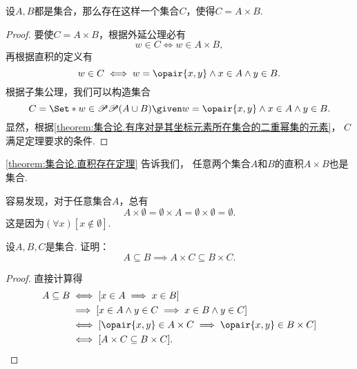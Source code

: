 \begin{theorem}\label{theorem:集合论.直积存在定理}
设\(A,B\)都是集合，那么存在这样一个集合\(C\)，使得\(C = A \times B\).
\begin{proof}
要使\(C = A \times B\)，根据外延公理必有\begin{equation*}
	w \in C \iff w \in A \times B,
\end{equation*}
再根据直积的定义有\begin{equation*}
	w \in C \iff w = \opair{x,y} \land x \in A \land y \in B.
\end{equation*}
根据子集公理，我们可以构造集合\begin{equation*}
	C = \Set*{
		w \in \Powerset\Powerset(A \cup B)
		\given
		w = \opair{x,y} \land x \in A \land y \in B
	}.
\end{equation*}
显然，根据\cref{theorem:集合论.有序对是其坐标元素所在集合的二重幂集的元素}，
\(C\)满足定理要求的条件.
\end{proof}
\end{theorem}
\cref{theorem:集合论.直积存在定理} 告诉我们，
任意两个集合\(A\)和\(B\)的直积\(A \times B\)也是集合.

容易发现，对于任意集合\(A\)，总有\begin{equation}
	A \times \emptyset
	= \emptyset \times A
	= \emptyset \times \emptyset
	= \emptyset.
\end{equation}
这是因为\((\forall x)[x \notin \emptyset]\).

\begin{example}
设\(A,B,C\)是集合.
证明：\begin{equation}
	A \subseteq B
	\implies
	A \times C \subseteq B \times C.
\end{equation}
\begin{proof}
直接计算得
\begin{align*}
	A \subseteq B
	&\iff [x \in A \implies x \in B] \\
	&\implies [x \in A \land y \in C \implies x \in B \land y \in C] \\
	&\iff [\opair{x,y} \in A \times C \implies \opair{x,y} \in B \times C] \\
	&\iff [A \times C \subseteq B \times C].
	\qedhere
\end{align*}
\end{proof}
\end{example}

